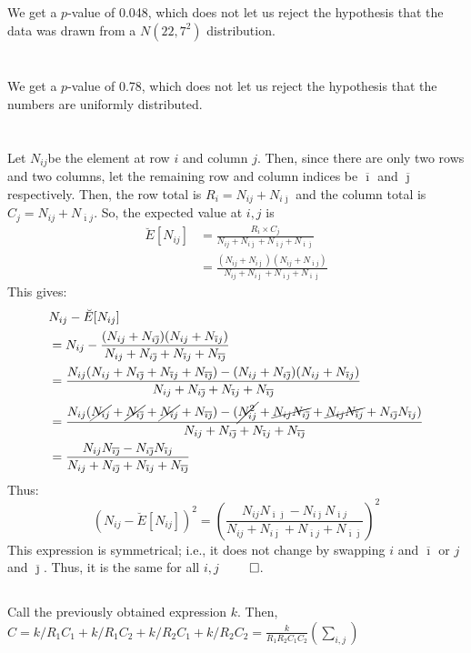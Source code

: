 \documentclass[twocolumn]{article}
\newcommand{\setsection}[1]{\setcounter{section}{#1}\addtocounter{section}{-1}\section{}}
\newcommand{\nsub}[2]{N_{#1 #2}}
\newcommand{\ovi}{\ensuremath{\overline{\imath}}}
\newcommand{\ovj}{\ensuremath{\overline{\jmath}}}
\newcommand{\na}{\ensuremath{\nsub{i}{j}}}
\newcommand{\nb}{\ensuremath{\nsub{i}{\ovj}}}
\newcommand{\nc}{\ensuremath{\nsub{\ovi}{j}}}
\newcommand{\nd}{\ensuremath{\nsub{\ovi}{\ovj}}}
\newcommand{\sumr}{\ensuremath{\na+\nb}}
\newcommand{\sumc}{\ensuremath{\na+\nc}}
\newcommand{\sums}{\ensuremath{\na+\nb+\nc+\nd}}
\begin{document}
\subsection{}

We get a $p$-value of 0.048, which does not let us reject the hypothesis that the data was drawn from a $N(22,7^2)$ distribution.

\setsection{25}

We get a $p$-value of 0.78, which does not let us reject the hypothesis that the numbers are uniformly distributed.

\setsection{29}

\subsection{}

Let \na be the element at row $i$ and column $j$. Then, since there are only two rows and two columns, let the remaining row and column indices be \ovi{} and \ovj{} respectively.
Then, the row total is $R_i=\sumr$ and the column total is $C_j=\sumc$. So, the expected value at $i,j$ is\begin{align*}
\breve{E}[\na]
&=\frac{R_i\times C_j}{\sums}	\\
&=\frac{(\sumr)(\sumc)}{\sums}
\end{align*}
This gives:\begin{align*}
&\na-\breve{E}[\na]\\
&=\na-\frac{(\sumr)(\sumc)}{\sums}\\
&=\frac{\na(\sums)-(\sumr)(\sumc)}{\sums}\\
&=\frac{\na(\cancel{\na}+\cancel{\nb}+\cancel{\nc}+\nd)-(\cancel{\na^2}+\cancel{\na\nb}+\cancel{\na\nc}+\nb\nc)}{\sums}\\
&=\frac{\na\nd-\nb\nc}{\sums}\\
\end{align*}
Thus:\[
(\na-\breve{E}[\na])^2=\left(\frac{\na\nd-\nb\nc}{\sums}\right)^2
\]
This expression is symmetrical; i.e., it does not change by swapping $i$ and \ovi{} or $j$ and \ovj{}. Thus, it is the same for all $i,j$ $\qed$.

\subsection{}

Call the previously obtained expression $k$. Then, $C=k/R_1C_1+k/R_1C_2+k/R_2C_1+k/R_2C_2=\frac{k}{R_1R_2C_1C_2}(\sum_{i,j})$
\end{document}
